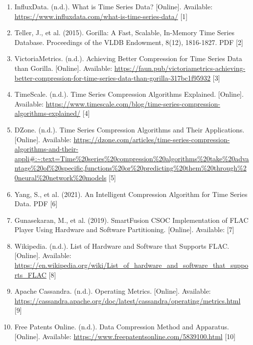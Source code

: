 \documentclass[conference]{IEEEtran}
\begin{document}
\begin{enumerate}
    \item InfluxData. (n.d.). What is Time Series Data? [Online]. Available: \url{https://www.influxdata.com/what-is-time-series-data/} [1]

    \item Teller, J., et al. (2015). Gorilla: A Fast, Scalable, In-Memory Time Series Database. Proceedings of the VLDB Endowment, 8(12), 1816-1827. PDF [2]

    \item VictoriaMetrics. (n.d.). Achieving Better Compression for Time Series Data than Gorilla. [Online]. Available: \href{https://faun.pub/victoriametrics-achieving-better-compression-for-time-series-data-than-gorilla-317bc1f95932}{https://faun.pub/victoriametrics-achieving-better-compression-for-time-series-data-than-gorilla-317bc1f95932} [3]

    \item TimeScale. (n.d.). Time Series Compression Algorithms Explained. [Online]. Available: \url{https://www.timescale.com/blog/time-series-compression-algorithms-explained/} [4]

    \item DZone. (n.d.). Time Series Compression Algorithms and Their Applications. [Online]. Available: \url{https://dzone.com/articles/time-series-compression-algorithms-and-their-appli#:~:text=Time%20series%20compression%20algorithms%20take%20advantage%20of%20specific,functions%20or%20predicting%20them%20through%20neural%20network%20models} [5]

    \item Yang, S., et al. (2021). An Intelligent Compression Algorithm for Time Series Data. PDF [6]

    \item Gunasekaran, M., et al. (2019). SmartFusion CSOC Implementation of FLAC Player Using Hardware and Software Partitioning. [Online]. Available: \href{https://www.microsemi.com/document-portal/doc_view/129825-ac376-smartfusion-csoc-implementation-of-flac-player-using-hardware-and-software-partitioning-app-note} [7]

    \item Wikipedia. (n.d.). List of Hardware and Software that Supports FLAC. [Online]. Available: \url{https://en.wikipedia.org/wiki/List_of_hardware_and_software_that_supports_FLAC} [8]

    \item Apache Cassandra. (n.d.). Operating Metrics. [Online]. Available: \url{https://cassandra.apache.org/doc/latest/cassandra/operating/metrics.html} [9]

    \item Free Patents Online. (n.d.). Data Compression Method and Apparatus. [Online]. Available: \url{https://www.freepatentsonline.com/5839100.html} [10]
\end{enumerate}
\end{document}

